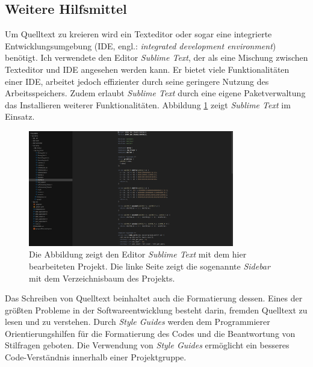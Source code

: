 \documentclass[crop=false]{standalone}
\begin{document}
  \subsection{Weitere Hilfsmittel} %
  \label{sub:weitere_hilfsmittel}
    Um Quelltext zu kreieren wird ein Texteditor oder sogar eine integrierte Entwicklungsumgebung (IDE, engl.: \textit{integrated development environment}) benötigt.
    Ich verwendete den Editor \textit{Sublime Text}, der als eine Mischung zwischen Texteditor und IDE angesehen werden kann.
    Er bietet viele Funktionalitäten einer IDE, arbeitet jedoch effizienter durch seine geringere Nutzung des Arbeitsspeichers.
    Zudem erlaubt \textit{Sublime Text} durch eine eigene Paketverwaltung das Installieren weiterer Funktionalitäten.
    Abbildung \ref{fig:sublime-text-example} zeigt \textit{Sublime Text} im Einsatz.
    \begin{figure}
      \center
      \includegraphics[width=0.8\textwidth]{images/sublime_text_example.png}
      \caption{%
        Die Abbildung zeigt den Editor \textit{Sublime Text} mit dem hier bearbeiteten Projekt.
        Die linke Seite zeigt die sogenannte \textit{Sidebar} mit dem Verzeichnisbaum des Projekts.
      }
      \label{fig:sublime-text-example}
    \end{figure}

    Das Schreiben von Quelltext beinhaltet auch die Formatierung dessen.
    Eines der größten Probleme in der Softwareentwicklung besteht darin, fremden Quelltext zu lesen und zu verstehen.
    Durch \textit{Style Guides} werden dem Programmierer Orientierungshilfen für die Formatierung des Codes und die Beantwortung von Stilfragen geboten.
    Die Verwendung von \textit{Style Guides} ermöglicht ein besseres Code-Verständnis innerhalb einer Projektgruppe.

\end{document}
